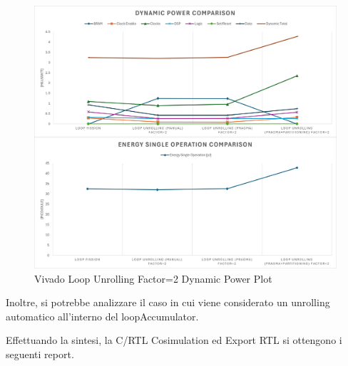 \begin{figure}[H]
    \centering
    \includegraphics[width=\textwidth]{solutions/loop_unrolling/factor2/loopunrollingfactor2power.png}
    \caption{Vivado Loop Unrolling Factor=2 Dynamic Power Plot}
    \label{fig:vivado-loop-unrolling-factor2-solution-power-plot}
\end{figure}


Inoltre, si potrebbe analizzare il caso in cui viene considerato un unrolling automatico all'interno del loopAccumulator.



Effettuando la sintesi, la C/RTL Cosimulation ed Export RTL si ottengono i seguenti report.

